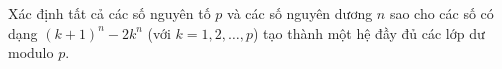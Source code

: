\ifshowproblem
\begin{problem}\label{example:HUN-2015-TST-KMA-640}
    Xác định tất cả các số nguyên tố $p$ và các số nguyên dương $n$ sao cho các số có dạng $(k+1)^n - 2k^n$ (với $k = 1, 2, \ldots, p$)
    tạo thành một hệ đầy đủ các lớp dư modulo $p$.
\end{problem}
\fi

\fi